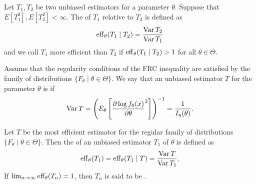\begin{definition}
    Let $T_{1},T_{2}$ be two unbiased estimators for a parameter $\theta$. Suppose that $E[T_{1}^{2}],E[T_{2}^{2}] < \infty$. The  of $T_{1}$ relative to $T_{2}$ is defined as
    \begin{align}
        \operatorname{eff}_{\theta} (T_{1} \mid T_{2}) = \frac{\operatorname{Var} T_{2}}{\operatorname{Var} T_{1}}
    \end{align}
    and we call $T_{1}$ more efficient than $T_{2}$ if $\operatorname{eff}_{\theta}(T_{1} \mid T_{2}) > 1$ for all $\theta \in \Theta$.
\end{definition}

\begin{definition}
    Assume that the regularity conditions of the FRC inequality are satisfied by the family of distributions $\{F_{\theta} \mid \theta \in \Theta\}$. We say that an unbiased estimator $T$ for the parameter $\theta$ is  if
    \begin{align}
        \operatorname{Var} T = \left( E_{\theta} \left[ \frac{\partial \log f_{\theta}(x)}{\partial \theta} ^{2}\right] \right)^{-1} = \frac{1}{I_{\eta}(\theta)}.
    \end{align}
\end{definition}

\begin{definition}
    Let $T$ be the most efficient estimator for the regular family of distributions $\{F_{\theta} \mid \theta \in \Theta\}$. Then the  of an unbiased estimator $T_{1}$ of $\theta$ is defined as
    \begin{align}
        \operatorname{eff}_{\theta}(T_{1}) = \operatorname{eff}_{\theta}(T_{1} \mid T) = \frac{\operatorname{Var} T}{\operatorname{Var} T_{1}}.
    \end{align}
    If $\lim_{n \to \infty} \operatorname{eff}_{\theta}(T_{n}) = 1$, then $T_{n}$ is said to be .
\end{definition}

